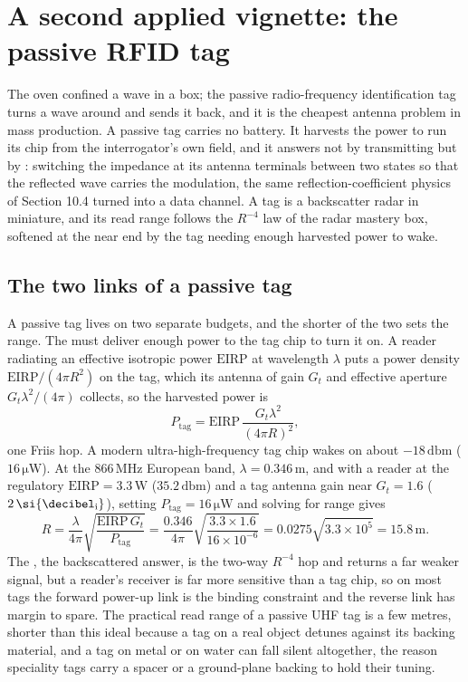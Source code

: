 \section{A second applied vignette: the passive RFID
tag}

The oven confined a wave in a box; the passive radio-frequency
identification tag turns a wave around and sends it back, and it is the
cheapest antenna problem in mass production. A passive tag carries no
battery. It harvests the power to run its chip from the interrogator's own
field, and it answers not by transmitting but by : switching the impedance at its antenna terminals between two
states so that the reflected wave carries the modulation, the same
reflection-coefficient physics of Section 10.4 turned into a data channel.
A tag is a backscatter radar in miniature, and its read range follows the
$R^{-4}$ law of the radar mastery box, softened at the near end by the tag
needing enough harvested power to wake.

\subsection{The two links of a passive tag}

A passive tag lives on two separate budgets, and the shorter of the two
sets the range. The  must deliver enough power to the
tag chip to turn it on. A reader radiating an effective isotropic power
$\text{EIRP}$ at wavelength $\lambda$ puts a power density $\text{EIRP}/
(4\pi R^2)$ on the tag, which its antenna of gain $G_t$ and effective
aperture $G_t\lambda^2/(4\pi)$ collects, so the harvested power is
\[
P_{\text{tag}} = \text{EIRP}\,\frac{G_t\lambda^2}{(4\pi R)^2},
\]
one Friis hop. A modern ultra-high-frequency tag chip wakes on about
$-18\,\si{\decibel}\text{m}$ ($16\,\si{\micro\watt}$). At the $866\,\si{
\mega\hertz}$ European band, $\lambda = 0.346\,\si{\meter}$, and with a
reader at the regulatory $\text{EIRP} = 3.3\,\si{\watt}$ ($35.2\,\si{
\decibel}\text{m}$) and a tag antenna gain near $G_t = 1.6$ ($2\,\si{
\decibel\textsubscript{i}}$), setting $P_{\text{tag}} = 16\,\si{\micro
\watt}$ and solving for range gives
\[
R = \frac{\lambda}{4\pi}\sqrt{\frac{\text{EIRP}\,G_t}{P_{\text{tag}}}}
= \frac{0.346}{4\pi}\sqrt{\frac{3.3\times 1.6}{16\times 10^{-6}}}
= 0.0275\sqrt{3.3\times 10^{5}} = 15.8\,\si{\meter}.
\]
The , the backscattered answer, is the two-way
$R^{-4}$ hop and returns a far weaker signal, but a reader's receiver is
far more sensitive than a tag chip, so on most tags the forward
power-up link is the binding constraint and the reverse link has margin to
spare. The practical read range of a passive UHF tag is a few metres,
shorter than this ideal because a tag on a real object detunes against its
backing material, and a tag on metal or on water can fall silent
altogether, the reason speciality tags carry a spacer or a ground-plane
backing to hold their tuning.


